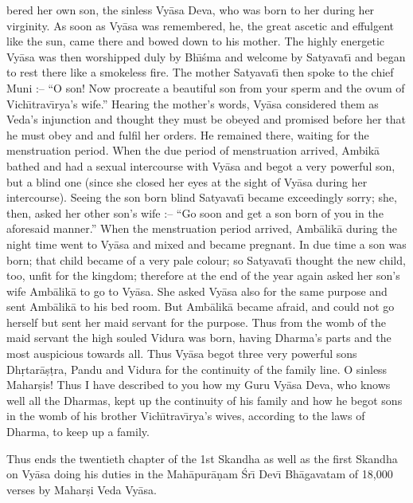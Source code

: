 bered her own son, the sinless Vy\=asa Deva, who was born to her during her virginity. As soon as Vy\=asa was remembered, he, the great ascetic and effulgent like the sun, came there and bowed down to his mother. The highly energetic Vy\=asa was then worshipped duly by Bh\={\i}\'sma and welcome by Satyavat\={\i} and began to rest there like a smokeless fire. The mother Satyavat\={\i} then spoke to the chief Muni :-- ``O son! Now procreate a beautiful son from your sperm and the ovum of Vich\={\i}trav\={\i}rya's wife.'' Hearing the mother's words, Vy\=asa considered them as Veda's injunction and thought they must be obeyed and promised before her that he must obey and and fulfil her orders. He remained there, waiting for the menstruation period. When the due period of menstruation arrived, Ambik\=a bathed and had a sexual intercourse with Vy\=asa and begot a very powerful son, but a blind one (since she closed her eyes at the sight of Vy\=asa during her intercourse). Seeing the son born blind Satyavat\={\i} became exceedingly sorry; she, then, asked her other son's wife :-- ``Go soon and get a son born of you in the aforesaid manner.'' When the menstruation period arrived, Amb\=alik\=a during the night time went to Vy\=asa and mixed and became pregnant. In due time a son was born; that child became of a very pale colour; so Satyavat\={\i} thought the new child, too, unfit for the kingdom; therefore at the end of the year again asked her son's wife Amb\=alik\=a to go to Vy\=asa. She asked Vy\=asa also for the same purpose and sent Amb\=alik\=a to his bed room. But Amb\=alik\=a became afraid, and could not go herself but sent her maid servant for the purpose. Thus from the womb of the maid servant the high souled Vidura was born, having Dharma's parts and the most auspicious towards all. Thus Vy\=asa begot three very powerful sons Dh\d{r}tar\=a\d{s}\d{t}ra, Pandu and Vidura for the continuity of the family line. O sinless Mahar\d{s}is! Thus I have described to you how my Guru Vy\=asa Deva, who knows well all the Dharmas, kept up the continuity of his family and how he begot sons in the womb of his brother Vich\={\i}trav\={\i}rya's wives, according to the laws of Dharma, to keep up a family.

Thus ends the twentieth chapter of the 1st Skandha as well as the first Skandha on Vy\=asa doing his duties in the Mah\=apur\=a\d{n}am \'Sr\={\i} Dev\={\i} Bh\=agavatam of 18,000 verses by Mahar\d{s}i Veda Vy\=asa.



